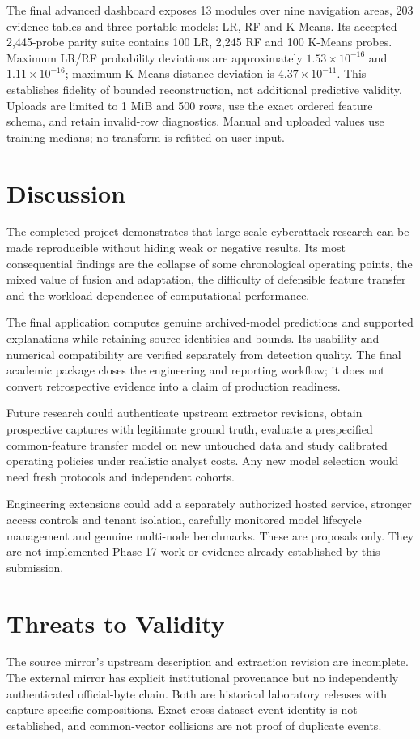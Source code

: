 \documentclass[conference]{IEEEtran}
\begin{document}
The final advanced dashboard exposes 13 modules over nine navigation areas, 203 evidence tables and three portable models: LR, RF and K-Means. Its accepted 2,445-probe parity suite contains 100 LR, 2,245 RF and 100 K-Means probes. Maximum LR/RF probability deviations are approximately $1.53\times10^{-16}$ and $1.11\times10^{-16}$; maximum K-Means distance deviation is $4.37\times10^{-11}$. This establishes fidelity of bounded reconstruction, not additional predictive validity. Uploads are limited to 1 MiB and 500 rows, use the exact ordered feature schema, and retain invalid-row diagnostics. Manual and uploaded values use training medians; no transform is refitted on user input.

\section{Discussion}
The completed project demonstrates that large-scale cyberattack research can be made reproducible without hiding weak or negative results. Its most consequential findings are the collapse of some chronological operating points, the mixed value of fusion and adaptation, the difficulty of defensible feature transfer and the workload dependence of computational performance.

The final application computes genuine archived-model predictions and supported explanations while retaining source identities and bounds. Its usability and numerical compatibility are verified separately from detection quality. The final academic package closes the engineering and reporting workflow; it does not convert retrospective evidence into a claim of production readiness.

Future research could authenticate upstream extractor revisions, obtain prospective captures with legitimate ground truth, evaluate a prespecified common-feature transfer model on new untouched data and study calibrated operating policies under realistic analyst costs. Any new model selection would need fresh protocols and independent cohorts.

Engineering extensions could add a separately authorized hosted service, stronger access controls and tenant isolation, carefully monitored model lifecycle management and genuine multi-node benchmarks. These are proposals only. They are not implemented Phase 17 work or evidence already established by this submission.

\section{Threats to Validity}
The source mirror's upstream description and extraction revision are incomplete. The external mirror has explicit institutional provenance but no independently authenticated official-byte chain. Both are historical laboratory releases with capture-specific compositions. Exact cross-dataset event identity is not established, and common-vector collisions are not proof of duplicate events.
\end{document}
